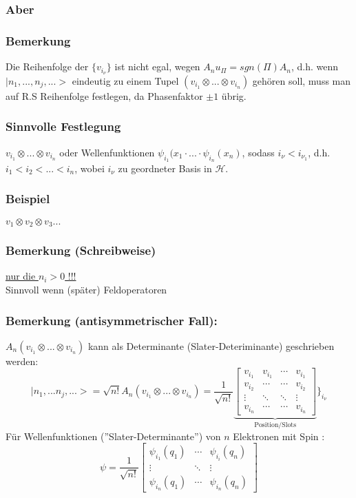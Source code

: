 \documentclass[twoside,a4paper]{scrartcl}
\renewcommand{\1}{\mathds{1}}
\renewcommand{\H}{\mathcal{H}}
\begin{document}
\subsubsection*{Aber}
\subsubsection*{Bemerkung}
Die Reihenfolge der $\{v_{i_\nu}\}$ ist nicht egal, wegen $A_n u_\Pi=sgn(\Pi) A_n$, d.h. wenn $|n_1,...,n_j,...>$ eindeutig zu einem Tupel $(v_{i_1}\otimes ... \otimes v_{i_n})$ gehören soll, muss man auf R.S Reihenfolge festlegen, da Phasenfaktor $\pm 1$ übrig.
\subsubsection*{Sinnvolle Festlegung}
$v_{i_1}\otimes ... \otimes v_{i_n}$ oder Wellenfunktionen $\psi_{i_1}(x_1\cdot ... \cdot \psi_{i_n}(x_n)$, sodass $i_\nu< i_{\nu_1}$, d.h. $i_1<i_2<...<i_n$, wobei $i_\nu$ zu geordneter Basis in $\H$.
\subsubsection*{Beispiel}
$v_1\otimes v_2 \otimes v_3 ...$
\subsubsection*{Bemerkung (Schreibweise)}
\underline{nur die $n_i>0$ !!!}\\
Sinnvoll wenn (später) Feldoperatoren

\subsubsection*{Bemerkung (antisymmetrischer Fall):}
$A_n(v_{i_1}\otimes ... \otimes v_{i_n})$ kann als Determinante (Slater-Deteriminante) geschrieben werden:
$$|n_1,...n_j,...>=\sqrt{n!} A_n(v_{i_1}\otimes ... \otimes v_{i_n})=\frac{1}{\sqrt{n!}} \underbrace{\begin{bmatrix} v_{i_1} & v_{i_1} & \cdots &v_{i_1}\\ v_{i_2} & \cdots & \cdots &v_{i_2} \\ \vdots & \ddots & \ddots & \vdots \\ v_{i_n} & \cdots & \cdots &v_{i_n} \end{bmatrix}}_{\mathrm{Position/Slots}}\rbrace_{i_\nu}$$
Für Wellenfunktionen (''Slater-Determinante'') von $n$ Elektronen mit Spin :
$$\psi=\frac{1}{\sqrt{n!}} \begin{bmatrix} \psi_{i_1}(q_1) & \cdots &\psi_{i_i}(q_n)\\ \vdots & \ddots & \vdots \\ \psi_{i_n}(q_1) & \cdots & \psi_{i_n}(q_n) \end{bmatrix}$$
\end{document}
